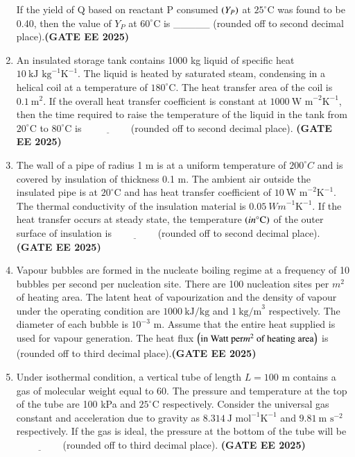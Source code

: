 \documentclass[journal,12pt,onecolumn]{IEEEtran}
\theoremstyle{remark}
\begin{document}
\begin{enumerate}
If the yield of Q based on reactant P consumed $\left(Y_{P}\right)$ at $25^{\circ}\text{C}$ was found to be 0.40, then the value of $Y_{P}$ at $60^{\circ}\text{C}$ is \_\_\_\_\_ (rounded off to second decimal place).\hfill \textbf{(GATE EE 2025)}

\item An insulated storage tank contains 1000 kg liquid of specific heat $10~\text{kJ kg}^{-1}\text{K}^{-1}$. The liquid is heated by saturated steam, condensing in a helical coil at a temperature of $180^{\circ}\text{C}$. The heat transfer area of the coil is $0.1~\text{m}^{2}$. If the overall heat transfer coefficient is constant at $1000~\text{W m}^{-2}\text{K}^{-1}$, then the time  required to raise the temperature of the liquid in the tank from $20^{\circ}\text{C}$ to $80^{\circ}\text{C}$ is $\underline{\hspace{2cm}}$(rounded off to second decimal place). \hfill \textbf{(GATE EE 2025)}



\item The wall of a pipe of radius 1 m is at a uniform temperature of $200^{\circ}C$ and is covered by insulation of thickness 0.1 m. The ambient air outside the insulated pipe is at $20^{\circ}\text{C}$ and has heat transfer coefficient of $10~\text{W m}^{-2}\text{K}^{-1}$. The thermal conductivity of the insulation material is $0.05~{W m}^{-1}\text{K}^{-1}$. If the heat transfer occurs at steady state, the temperature $\left(in {}^{\circ}\text{C}\right)$ of the outer surface of insulation is$\underline{\hspace{2cm}}$(rounded off to second decimal place).\hfill \textbf{(GATE EE 2025)}



\item  Vapour bubbles are formed in the nucleate boiling regime at a frequency of 10 bubbles per second per nucleation site. There are 100 nucleation sites per $m^2$ of heating area. The latent heat of vapourization and the density of vapour under the operating condition are $1000~\text{kJ/kg}$ and $1~\text{kg/m}^{3}$ respectively. The diameter of each bubble is $10^{-3}$ m. Assume that the entire heat supplied is used for vapour generation. The heat flux $\left(\text{in Watt per} {m}^{2} \text{ of heating area}\right)$ is (rounded off to third decimal place).\hfill \textbf{(GATE EE 2025)}



\item Under isothermal condition, a vertical tube of length $L=100$ m contains a gas of molecular weight equal to 60. The pressure and temperature at the top of the tube are 100 kPa and $25^{\circ}\text{C}$ respectively. Consider the universal gas constant and acceleration due to gravity as $8.314~\text{J mol}^{-1}\text{K}^{-1}$ and $9.81~\text{m s}^{-2}$ respectively. If the gas is ideal, the pressure  at the bottom of the tube will be$\underline{\hspace{2cm}}$(rounded off to third decimal place). \hfill \textbf{(GATE EE 2025)} 




\end{enumerate}
\end{document}
